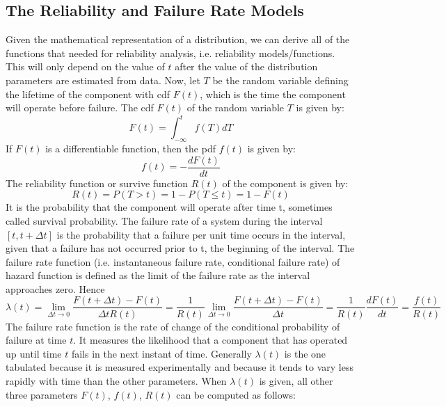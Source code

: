 \subsection{The Reliability and Failure Rate Models}
Given the mathematical representation of a distribution, we can derive all of the functions that needed
for reliability analysis, i.e. reliability models/functions. This will only depend on the value of $t$
after the value of the distribution parameters are estimated from data.
Now, let $T$ be the random variable defining the lifetime of the component with cdf $F(t)$, which is the
time the component will operate before failure. The cdf $F(t)$ of the random variable $T$ is given by:
\begin{equation}
  F(t) = \int_{-\infty}^{t} f(T)dT
\end{equation}
If $F(t)$ is a differentiable function, then the pdf $f(t)$ is given by:
\begin{equation}
  f(t) = - \frac{dF(t)}{dt}
\end{equation}
The reliability function or survive function $R(t)$ of the component is given by:
\begin{equation}
  R(t) = P(T>t) = 1 - P(T\leq t) = 1-F(t)
\end{equation}
It is the probability that the component will operate after time t, sometimes called survival probability.
The failure rate of a system during the interval $[t,t+\Delta t]$ is the probability that a failure per
unit time occurs in the interval, given that a failure has not occurred prior to t, the beginning of the
interval. The failure rate function (i.e. instantaneous failure rate, conditional failure rate) of hazard
function is defined as the limit of the failure rate as the interval approaches zero. Hence
\begin{equation}
  \lambda (t)= \lim_{\Delta t\rightarrow 0} \frac{F(t+\Delta t) - F(t)}{\Delta tR(t)}
	 = \frac{1}{R(t)} \lim_{\Delta t\rightarrow 0} \frac{F(t+\Delta t) - F(t)}{\Delta t}
	 = \frac{1}{R(t)}\frac{dF(t)}{dt} = \frac{f(t)}{R(t)}
\end{equation}
The failure rate function is the rate of change of the conditional probability of failure at time $t$.
It measures the likelihood that a component that has operated up until time $t$ fails in the next
instant of time.
Generally $\lambda (t)$ is the one tabulated because it is measured experimentally and because it tends to
vary less rapidly with time than the other parameters. When $\lambda (t)$ is given, all other three
parameters $F(t)$, $f(t)$, $R(t)$ can be computed as follows:
